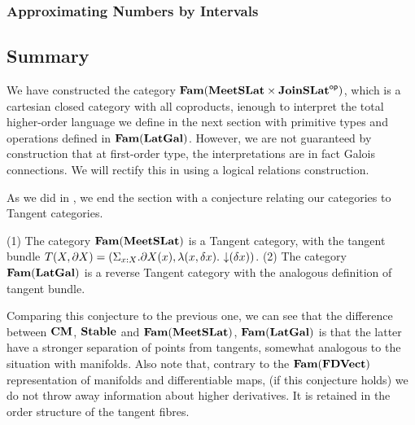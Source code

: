 \subsubsection{Approximating Numbers by Intervals}


\subsection{Summary}

We have constructed the category
$\mathbf{Fam}(\mathbf{MeetSLat} \times \mathbf{JoinSLat}^{\mathsf{op}})$, which is a cartesian closed
category with all coproducts, ienough to interpret the total
higher-order language we define in the next section with primitive
types and operations defined in $\mathbf{Fam}(\mathbf{LatGal})$. However, we are not
guaranteed by construction that at first-order type, the
interpretations are in fact Galois connections. We will rectify this
in  using a logical relations construction.

As we did in , we end the section with a
conjecture relating our categories to Tangent categories.

\begin{conjecture}
  (1) The category $\mathbf{Fam}(\mathbf{MeetSLat})$ is a Tangent category, with the
  tangent bundle
  $T(X, \partial X) = (\Sigma_{x : X}. \partial X(x), \lambda (x,
  \delta x).\, \mathop{\downarrow}(\delta x))$. (2) The category $\mathbf{Fam}(\mathbf{LatGal})$
  is a reverse Tangent category with the analogous definition of
  tangent bundle.
\end{conjecture}

Comparing this conjecture to the previous one, we can see that the
difference between $\mathbf{CM}$, $\mathbf{Stable}$ and $\mathbf{Fam}(\mathbf{MeetSLat})$,
$\mathbf{Fam}(\mathbf{LatGal})$ is that the latter have a stronger separation of
points from tangents, somewhat analogous to the situation with
manifolds. Also note that, contrary to the $\mathbf{Fam}(\mathbf{FDVect})$
representation of manifolds and differentiable maps, (if this
conjecture holds) we do not throw away information about higher
derivatives. It is retained in the order structure of the tangent
fibres.
